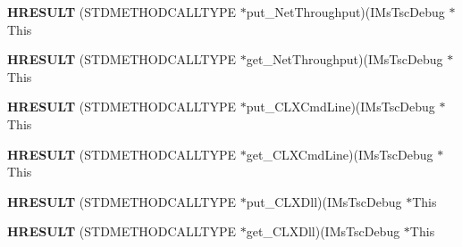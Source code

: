 \begin{DoxyCompactItemize}
\mbox{\label{struct_i_ms_tsc_debug_vtbl_aae1e9e7abb9a001f8970ddb0876b3c29}} 
{\bfseries H\+R\+E\+S\+U\+LT} (S\+T\+D\+M\+E\+T\+H\+O\+D\+C\+A\+L\+L\+T\+Y\+PE $\ast$put\+\_\+\+Net\+Throughput)(I\+Ms\+Tsc\+Debug $\ast$This
\item 
\mbox{\label{struct_i_ms_tsc_debug_vtbl_a3cc36dbff3ae2768ca2eff60fd79609d}} 
{\bfseries H\+R\+E\+S\+U\+LT} (S\+T\+D\+M\+E\+T\+H\+O\+D\+C\+A\+L\+L\+T\+Y\+PE $\ast$get\+\_\+\+Net\+Throughput)(I\+Ms\+Tsc\+Debug $\ast$This
\item 
\mbox{\label{struct_i_ms_tsc_debug_vtbl_a1f1c5ff2b696ab60de8d7e5e408a008e}} 
{\bfseries H\+R\+E\+S\+U\+LT} (S\+T\+D\+M\+E\+T\+H\+O\+D\+C\+A\+L\+L\+T\+Y\+PE $\ast$put\+\_\+\+C\+L\+X\+Cmd\+Line)(I\+Ms\+Tsc\+Debug $\ast$This
\item 
\mbox{\label{struct_i_ms_tsc_debug_vtbl_aafb9ebccfc1eddf1eeffa56200af305d}} 
{\bfseries H\+R\+E\+S\+U\+LT} (S\+T\+D\+M\+E\+T\+H\+O\+D\+C\+A\+L\+L\+T\+Y\+PE $\ast$get\+\_\+\+C\+L\+X\+Cmd\+Line)(I\+Ms\+Tsc\+Debug $\ast$This
\item 
\mbox{\label{struct_i_ms_tsc_debug_vtbl_a91069bae5f39b0be5029ca2481bad3c2}} 
{\bfseries H\+R\+E\+S\+U\+LT} (S\+T\+D\+M\+E\+T\+H\+O\+D\+C\+A\+L\+L\+T\+Y\+PE $\ast$put\+\_\+\+C\+L\+X\+Dll)(I\+Ms\+Tsc\+Debug $\ast$This
\item 
\mbox{\label{struct_i_ms_tsc_debug_vtbl_acf0b18882398f77db5a73be2f3948d46}} 
{\bfseries H\+R\+E\+S\+U\+LT} (S\+T\+D\+M\+E\+T\+H\+O\+D\+C\+A\+L\+L\+T\+Y\+PE $\ast$get\+\_\+\+C\+L\+X\+Dll)(I\+Ms\+Tsc\+Debug $\ast$This
\end{DoxyCompactItemize}
